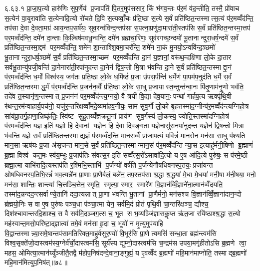 ६.६३.१
प्रा॒जा॒प॒त्यो हारु॑णिः सुप॒र्णेय॑ प्र॒जाप॑तिं पि॒तर॒मुप॑ससार॒ किं भ॑गव॒न्तः प॑र॒मं व॑द॒न्तीति॒ तस्मै॒ प्रो॑वाच स॒त्येन॑ वा॒युरावा॑ति स॒त्येना॑दि॒त्यो रो॑चते दि॒वि स॒त्यव्वाँ॒चः प्र॑ति॒ष्ठा स॒त्ये स॒र्वं प्रति॑ष्ठित॒न्तस्मात्स॒त्यं प॑र॒मव्वँद॑न्ति॒ तप॑सा दे॒वा दे॒वता॒मग्र॑ आय॒न्तप॒सर्\mbox{}ष॑यः॒ सुव॒रन्व॑विन्द॒न्तप॑सा स॒पत्ना॒प्रणु॑दा॒मारा॑ती॒स्तप॑सि स॒र्वं प्रति॑ष्ठित॒न्तस्मा॒त्तप॑ पर॒मव्वँद॑न्ति॒ दमे॑न दा॒न्ताः कि॒ल्बिष॑मवधू॒न्वन्ति॒ दमे॑न ब्रह्मचा॒रिणः॒ सुव॑रगच्छ॒न्दमो॑ भू॒तानान्दुरा॒धर्\mbox{}ष॒न्दमे॑ स॒र्वं प्रति॑ष्ठित॒न्तस्मा॒द्दम॑ पर॒मव्वँद॑न्ति॒ शमे॑न शा॒न्ताश्शि॒वमा॒चर॑न्ति॒ शमे॑न ना॒कं मु॒नयो॒ऽन्ववि॑न्द॒ञ्छमो॑ भू॒तानान्दुरा॒धर्\mbox{}ष॒ञ्छमे॑ स॒र्वं प्रति॑ष्ठित॒न्तस्मा॒च्छम॑ पर॒मव्वँद॑न्ति दा॒नं य॒ज्ञानां॒ वरू॑थ॒न्दक्षि॑णा लो॒के दा॒तार सर्वभू॒तान्यु॑पजी॒वन्ति॑ दा॒नेनारा॑ती॒रपा॑नुदन्त दा॒नेन॑ द्विष॒न्तो मि॒त्रा भ॑वन्ति दा॒ने स॒र्वं प्रति॑ष्ठित॒न्तस्माद्दा॒नं प॑र॒मव्वँद॑न्ति ध॒र्मो विश्व॑स्य॒ जग॑तः प्रति॒ष्ठा लो॒के ध॒र्मिष्ठं॑ प्र॒जा उ॑पस॒र्पन्ति॑ ध॒र्मेण॑ पा॒पम॑प॒नुद॑ति ध॒र्मे स॒र्वं प्रति॑ष्ठित॒न्तस्माद्ध॒र्मं प॑र॒मव्वँद॑न्ति प्र॒जन॑न॒व्वैँ प्र॑ति॒ष्ठा लो॒के सा॒धु प्र॒जायास्त॒न्तुन्त॑न्वा॒नः पि॑तृ॒णाम॑नृ॒णो भव॑ति॒ तदे॑व त॒स्यानृ॑ण॒न्तस्मात् प्र॒जन॑नं पर॒मव्वँद॑न्त्य॒ग्नयो॒ वै त्रयी॑ वि॒द्या दे॑व॒यानः॒ पन्था॑ गार्\mbox{}हप॒त्य ऋक्पृ॑थि॒वी र॑थन्त॒रम॑न्वाहार्य॒पच॑नो॒ यजु॑र॒न्तरि॑क्षव्वाँमदे॒व्यमा॑हव॒नीयः॒ साम॑ सुव॒र्गो लो॒को बृ॒हत्तस्मा॑द॒ग्नीन्प॑र॒मव्वँद॑न्त्यग्निहो॒त्र सा॑यंप्रा॒तर्गृ॒हाणा॒न्निष्कृ॑तिः॒ स्वि॑ष्ट सुहु॒तय्यँ॑ज्ञक्रतू॒नां प्राय॑ण सुव॒र्गस्य॑ लो॒कस्य॒ ज्योति॒स्तस्मा॑दग्निहो॒त्रं प॑र॒मव्वँद॑न्ति य॒ज्ञ इति॑ य॒ज्ञो हि दे॒वानां य॒ज्ञेन॒ हि दे॒वा दिव॑ङ्ग॒ता य॒ज्ञेनासु॑रा॒नपा॑नुदन्त य॒ज्ञेन॑ द्विष॒न्तो मि॒त्रा भ॑वन्ति य॒ज्ञे स॒र्वं प्रति॑ष्ठित॒न्तस्माद्य॒ज्ञं प॑र॒मव्वँद॑न्ति मान॒सव्वैँ प्रा॑जाप॒त्यं प॒वित्रं॑ मान॒सेन॒ मन॑सा सा॒धु प॑श्यति मान॒सा ऋष॑यः प्र॒जा अ॑सृजन्त मान॒से स॒र्वं प्रति॑ष्ठित॒न्तस्मान्मान॒सं प॑र॒मव्वँद॑न्ति न्या॒स इ॒त्याहु॑र्मनी॒षिणो ब्र॒ह्माणं॑ ब्र॒ह्मा विश्व॑ कत॒मः स्व॑य॒म्भुः प्र॒जाप॑तिः संवत्स॒र इति॑ सव्वँत्स॒रो॑ऽसावा॑दि॒त्यो य ए॒ष आ॑दि॒त्ये पुरु॑षः॒ स प॑रमे॒ष्ठी ब्रह्मा॒त्मा याभि॑रादि॒त्यस्तप॑ति र॒श्मिभि॒स्ताभि॑ प॒र्जन्यो॑ वर्\mbox{}षति प॒र्जन्ये॑नौषधिवनस्प॒तयः॒ प्रजा॑यन्त ओषधिवनस्प॒तिभि॒रन्नं॑ भव॒त्यन्ने॑न प्रा॒णाः प्रा॒णैर्बलं॒ बले॑न॒ तप॒स्तप॑सा श्र॒द्धा श्र॒द्धया॑ मे॒धा मे॒धया॑ मनी॒षा म॑नी॒षया॒ मनो॒ मन॑सा॒ शान्तिः॒ शान्त्या॑ चि॒त्तञ्चि॒त्तेन॒ स्मृति॒ स्मृत्या॒ स्मार॒ स्मारे॑ण वि॒ज्ञान॑व्विँ॒ज्ञाने॑ना॒त्मान॑व्वेँदयति॒ तस्मा॑द॒न्नन्दद॒न्त्सर्वाण्ये॒तानि॑ ददा॒त्यन्नात् प्रा॒णा भ॑वन्ति भू॒तानां प्रा॒णैर्मनो॒ मन॑सश्च वि॒ज्ञान॑व्विँ॒ज्ञाना॑दान॒न्दो ब्र॑ह्मयो॒निः स वा ए॒ष पुरु॑षः पञ्च॒धा प॑ञ्चा॒त्मा येन॒ सर्व॑मि॒दं प्रोतं॑ पृथि॒वी चा॒न्तरि॑क्षञ्च॒ द्यौश्च॒ दिश॑श्चावान्तरदि॒शाश्च॒ स वै सर्व॑मि॒दञ्जग॒त्स च॒ भूत स भ॒व्यञ्जि॑ज्ञासकॢ॒प्त ऋ॑त॒जा रयि॑ष्ठाश्श्र॒द्धा स॒त्यो मह॑स्वान्त॒मसो॒परि॑ष्टा॒द्ज्ञात्वा॑ तमे॒वं मन॑सा हृ॒दा च॒ भूयो॑ न मृ॒त्युमुप॑याहि वि॒द्वान्तस्मान्न्या॒समे॒षान्तप॑सामतिरिक्त॒माहु॑र्वसुर॒ण्यो॑ वि॒भूर॑सि प्रा॒णे त्वमसि॑ सन्धा॒ता ब्रह्म॑न्त्वम॑सि विश्व॒सृक्ते॑जो॒दास्त्वम॑स्य॒ग्नेर्व॑र्चो॒दास्त्वम॑सि॒ सूर्य॑स्य द्युम्नो॒दास्त्वम॑सि च॒न्द्रम॑स उपया॒मगृ॑हीतोऽसि ब्र॒ह्मणे त्वा॒ महस॒ ओमित्या॒त्मान॑य्युँञ्जीतै॒तद्वै म॑होप॒निष॑दन्दे॒वाना॒ङ्गुह्यं॒ य ए॒वव्वेँद॑ ब्र॒ह्मणो॑ महि॒मान॑माप्नोति॒ तस्माद्ब्र॒ह्मणो॑ महि॒मान॑मित्युप॒निष॑त्॥७८॥
\anuvakamend

